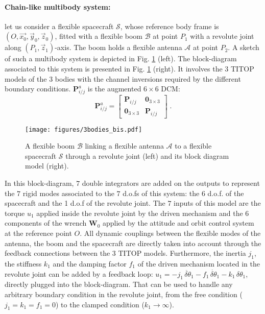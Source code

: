 \paragraph{Chain-like multibody system:}
let us consider a flexible spacecraft $\mathcal{S}$, whose reference body frame is $(O,\vec{x_0},\vec{y}_0,\vec{z}_0)$, fitted with a flexible boom $\mathcal{B}$ at point $P_1$ with a revolute joint along $(P_1,\vec{z}_1)$-axis.  The boom holds a flexible antenna $\mathcal{A}$ at point $P_2$. A sketch of such a multibody system is depicted in Fig. \ref{fig:3bodies} (left). The block-diagram associated to this system is presented in Fig.  \ref{fig:3bodies} (right). It involves the 3 TITOP models of the 3 bodies with the channel inversions required by the different boundary conditions. $\mathbf{P}^a_{i/j}$ is the augmented $6 \times 6$ DCM:
\[
\mathbf{P}^a_{i/j}=\left[\begin{array}{cc}\mathbf{P}_{i/j}& \mathbf{0}_{3\times 3}\\\mathbf{0}_{3\times 3} & \mathbf{P}_{i/j}\end{array}\right]\;.
\]
\begin{figure}[htbp!]
  \texttt{[image: figures/3bodies\_bis.pdf]}
\caption{A flexible boom $\mathcal{B}$ linking a flexible antenna $\mathcal{A}$ to a flexible spacecraft $\mathcal{S}$ through a revolute joint (left) and its block diagram model (right).}
\label{fig:3bodies} 
\end{figure}

In this block-diagram, $7$ double integrators are added on the outputs to represent the $7$ rigid modes associated to the $7$ d.o.fs of this system: the 6 d.o.f. of the spacecraft and the 1 d.o.f of the revolute joint. The $7$ inputs of this model are the torque $u_1$ applied inside the revolute joint by the driven mechanism and the $6$ components of the wrench $\mathbf{W}_0$ applied by the attitude and orbit control system at the reference point $O$. All dynamic couplings between the flexible modes of the antenna, the boom and the spacecraft are directly taken into account through the feedback connections between the 3 TITOP models. Furthermore, the inertia $j_1$, the stiffness $k_1$ and the damping factor $f_1$ of the driven mechanism located in the revolute joint can be added by a feedback loop: $u_1=-j_1\,\ddot{\delta \theta}_1-f_1\,\dot{\delta \theta}_1-k_1\,\delta \theta_1$, directly plugged into the block-diagram. That can be used to handle any arbitrary boundary condition in the revolute joint, from the free condition ($j_1=k_1=f_1=0$) to the clamped condition ($k_1\to \infty$).

